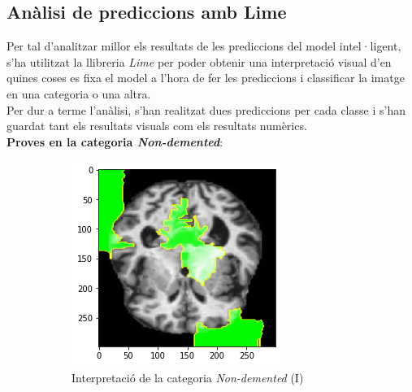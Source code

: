\documentclass[a4paper,12pt]{report}
\begin{document}
\subsection*{Anàlisi de prediccions amb Lime}
Per tal d'analitzar millor els resultats de les prediccions del model intel·ligent, s'ha utilitzat la llibreria \textit{Lime} per poder obtenir una interpretació visual d'en quines coses es fixa el model a l'hora de fer les prediccions i classificar la imatge en una categoria o una altra.\\
Per dur a terme l'anàlisi, s'han realitzat dues prediccions per cada classe i s'han guardat tant els resultats visuals com els resultats numèrics.\\
\textbf{Proves en la categoria \textit{Non-demented}}:
\begin{figure}[h!]
    \centering
    \begin{subfigure}[b]{0.40\linewidth}
        \includegraphics[width=\linewidth]{images/Non-demented.png}
        \caption{Interpretació de la categoria \textit{Non-demented} (I)}
        \label{fig:ND1}
    \end{subfigure}
    \begin{subfigure}[b]{0.40\linewidth}

\end{subfigure}
\end{figure}
\end{document}
